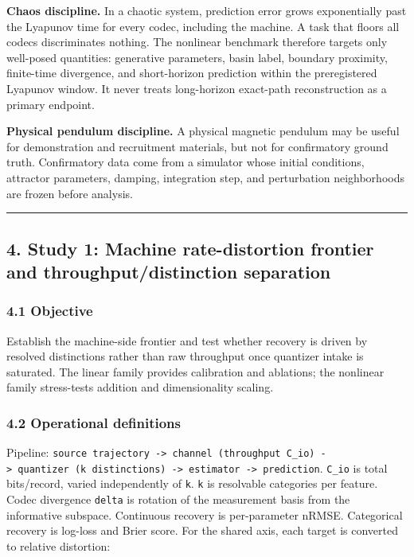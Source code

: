 \documentclass[
  11pt,
]{article}
\begin{document}
\textbf{Chaos discipline.} In a chaotic system,
prediction error grows exponentially past the
Lyapunov time for every codec, including the
machine. A task that floors all codecs
discriminates nothing. The nonlinear benchmark
therefore targets only well-posed quantities:
generative parameters, basin label, boundary
proximity, finite-time divergence, and
short-horizon prediction within the
preregistered Lyapunov window. It never treats
long-horizon exact-path reconstruction as a
primary endpoint.

\textbf{Physical pendulum discipline.} A
physical magnetic pendulum may be useful for
demonstration and recruitment materials, but not
for confirmatory ground truth. Confirmatory data
come from a simulator whose initial conditions,
attractor parameters, damping, integration step,
and perturbation neighborhoods are frozen before
analysis.

\begin{center}\rule{0.5\linewidth}{0.5pt}\end{center}

\subsection{4. Study 1: Machine rate-distortion
frontier and throughput/distinction
separation}\label{study-1-machine-rate-distortion-frontier-and-throughputdistinction-separation}

\subsubsection{4.1 Objective}\label{objective}

Establish the machine-side frontier and test
whether recovery is driven by resolved
distinctions rather than raw throughput once
quantizer intake is saturated. The linear family
provides calibration and ablations; the
nonlinear family stress-tests addition and
dimensionality scaling.

\subsubsection{4.2 Operational
definitions}\label{operational-definitions}

Pipeline:
\texttt{source\ trajectory\ -\textgreater{}\ channel\ (throughput\ C\_io)\ -\textgreater{}\ quantizer\ (k\ distinctions)\ -\textgreater{}\ estimator\ -\textgreater{}\ prediction}.
\texttt{C\_io} is total bits/record, varied
independently of \texttt{k}. \texttt{k} is
resolvable categories per feature. Codec
divergence \texttt{delta} is rotation of the
measurement basis from the informative subspace.
Continuous recovery is per-parameter nRMSE.
Categorical recovery is log-loss and Brier
score. For the shared axis, each target is
converted to relative distortion:
\end{document}
